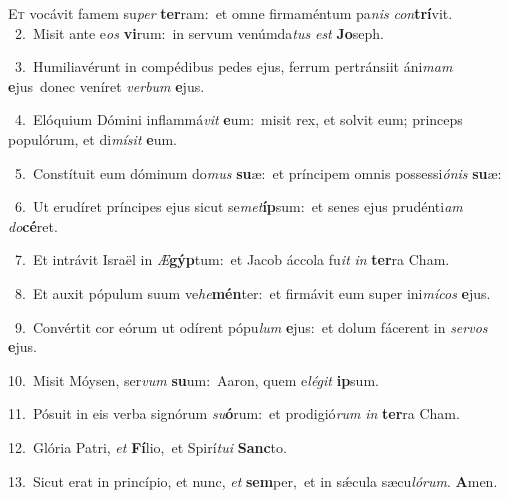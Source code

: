 \lettrine{\initial\textcolor{\initialcolor}{E}}{t} vocávit famem su\textit{per} \textbf{ter}\-ram:~\star et omne firmaméntum pa\textit{nis} \textit{con}\-\textbf{trí}vit.\\
{\numbfont\textcolor{\numbcolor}{~2.}}~Misit ante e\textit{os} \textbf{vi}\-rum:~\star in servum venúmda\textit{tus} \textit{est} \textbf{Jo}\-seph.\par
{\numbfont\textcolor{\numbcolor}{~3.}}~Humiliavérunt in compédibus pedes ejus, ferrum pertránsiit áni\textit{mam} \textbf{e}\-jus~\star donec veníret \textit{ver}\-\textit{bum} \textbf{e}\-jus.\par
{\numbfont\textcolor{\numbcolor}{~4.}}~Elóquium Dómini inflammá\textit{vit} \textbf{e}\-um:~\star misit rex, et solvit eum; princeps populórum, et di\-\textit{mí}\-\textit{sit} \textbf{e}\-um.\par
{\numbfont\textcolor{\numbcolor}{~5.}}~Constítuit eum dóminum do\textit{mus} \textbf{su}\-æ:~\star et príncipem omnis possessi\-\textit{ó}\-\textit{nis} \textbf{su}\-æ:\par
{\numbfont\textcolor{\numbcolor}{~6.}}~Ut erudíret príncipes ejus sicut se\-\textit{met}\-\textbf{íp}sum:~\star et senes ejus prudénti\textit{am} \textit{do}\-\textbf{cé}ret.\par
{\numbfont\textcolor{\numbcolor}{~7.}}~Et intrávit Israël in \textit{Æ}\-\textbf{gýp}tum:~\star et Jacob áccola fu\textit{it} \textit{in} \textbf{ter}\-ra Cham.\par
{\numbfont\textcolor{\numbcolor}{~8.}}~Et auxit pópulum suum ve\-\textit{he}\-\textbf{mén}ter:~\star et firmávit eum super ini\-\textit{mí}\-\textit{cos} \textbf{e}\-jus.\par
{\numbfont\textcolor{\numbcolor}{~9.}}~Convértit cor eórum ut odírent pópu\textit{lum} \textbf{e}\-jus:~\star et dolum fácerent in \textit{ser}\-\textit{vos} \textbf{e}\-jus.\par
{\numbfont\textcolor{\numbcolor}{10.}}~Misit Móysen, ser\textit{vum} \textbf{su}\-um:~\star Aaron, quem e\-\textit{lé}\-\textit{git} \textbf{ip}\-sum.\par
{\numbfont\textcolor{\numbcolor}{11.}}~Pósuit in eis verba signórum \textit{su}\-\textbf{ó}rum:~\star et prodigió\textit{rum} \textit{in} \textbf{ter}\-ra Cham.\par
{\numbfont\textcolor{\numbcolor}{12.}}~Glória Patri, \textit{et} \textbf{Fí}\-lio,~\star et Spirí\-\textit{tu}\-\textit{i} \textbf{Sanc}\-to.\par
{\numbfont\textcolor{\numbcolor}{13.}}~Sicut erat in princípio, et nunc, \textit{et} \textbf{sem}\-per,~\star et in sǽcula sæcu\-\textit{ló}\-\textit{rum}. \textbf{A}\-men.\par
